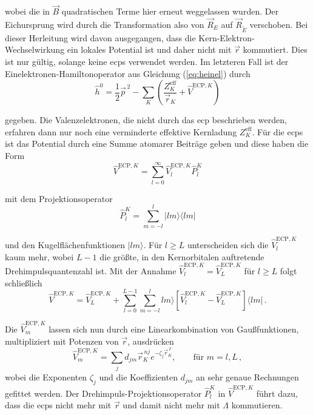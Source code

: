 	wobei die in $\vec{B}$ quadratischen Terme hier erneut weggelassen wurden. Der Eichursprung wird durch die Transformation also von $\vec{R}_E$ auf $\vec{R}_{\tilde{E}}$ verschoben. Bei dieser Herleitung wird davon ausgegangen, dass die Kern-Elektron-Wechselwirkung ein lokales Potential ist und daher nicht mit $\vec{r}$ kommutiert. Dies ist nur gültig, solange keine \acp{ecp} verwendet werden. Im letzteren Fall ist der Einelektronen-Hamiltonoperator aus Gleichung (\ref{eq:heinel}) durch	
	\begin{equation}
	\hat{h}^0=\frac{1}{2}\vec{p}^{\,2}-\sum_K \left(\frac{Z_K^{\textrm{eff}}}{\vec{r}_K}+\hat{V}^{\textrm{ECP},K}\right)
	\end{equation}
	
	gegeben. Die Valenzelektronen, die nicht durch das \ac{ecp} beschrieben werden, erfahren dann nur noch eine verminderte effektive Kernladung $Z_K^{\textrm{eff}}$. Für die \acp{ecp} ist das Potential durch eine Summe atomarer Beiträge geben und diese haben die Form\supercite{mcmurchie1981calculation,cao2010relativistic}
	\begin{equation}\label{eq:ecpotential}
	\hat{V}^{\textrm{ECP},K}=\sum_{l=0}^{\infty}\hat{V}^{\textrm{ECP},K}_l\hat{P}_l^K
	\end{equation}
	
	mit dem Projektionsoperator
	\begin{equation}
	\hat{P}_l^K=\sum_{m=-l}^l\vert lm\rangle\langle lm\vert
	\end{equation}
	
	und den Kugelflächenfunktionen $\vert lm\rangle$. Für $l\geq L$ unterscheiden sich die $\hat{V}^{\textrm{ECP},K}_l$ kaum mehr, wobei $L-1$ die größte, in den Kernorbitalen auftretende Drehimpulsquantenzahl ist. Mit der Annahme $\hat{V}^{\textrm{ECP},K}_l=\hat{V}^{\textrm{ECP},K}_L$ für $l\geq L$ folgt schließlich\supercite{kahn1972ab}
	\begin{equation}
	\hat{V}^{\textrm{ECP},K}=\hat{V}^{\textrm{ECP},K}_{L}+\sum_{l=0}^{L-1}\sum_{m=-l}^l lm\rangle\left[\hat{V}^{\textrm{ECP},K}_{l}-\hat{V}^{\textrm{ECP},K}_{L}\right]\langle lm\vert \, .
	\end{equation}
	
	Die $\hat{V}^{\textrm{ECP},K}_{m}$ lassen sich nun durch eine Linearkombination von Gaußfunktionen, multipliziert mit Potenzen von $\vec{r}$, ausdrücken\supercite{kahn1972ab}
	\begin{equation}
	\hat{V}^{\textrm{ECP},K}_{m}=\sum_jd_{jm}\vec{r}_K^{\,nj}e^{-\zeta_j\vec{r}_K^{\,2}}, \qquad \textrm{für } m=l,L\, ,
	\end{equation}
	wobei die Exponenten $\zeta_j$ und die Koeffizienten $d_{jm}$ an sehr genaue Rechnungen gefittet werden. Der Drehimpuls-Projektionsoperator $\hat{P}_l^K$ in $\hat{V}^{\textrm{ECP},K}$ führt dazu, dass die \acp{ecp} nicht mehr mit $\vec{r}$ und damit nicht mehr mit $\Lambda$ kommutieren. 
	
